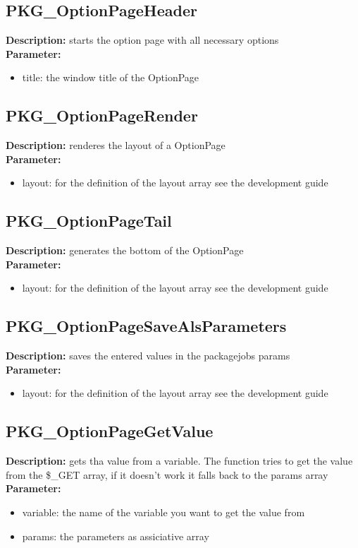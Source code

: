 \subsection{PKG\_OptionPageHeader}
\textbf{Description:} starts the option page with all necessary options\\
\textbf{Parameter:}
\begin{itemize}
\item title: the window title of the OptionPage
\end{itemize}

\subsection{PKG\_OptionPageRender}
\textbf{Description:} renderes the layout of a OptionPage\\
\textbf{Parameter:}
\begin{itemize}
\item layout: for the definition of the layout array see the development guide
\end{itemize}

\subsection{PKG\_OptionPageTail}
\textbf{Description:} generates the bottom of the OptionPage\\
\textbf{Parameter:}
\begin{itemize}
\item layout: for the definition of the layout array see the development guide
\end{itemize}

\subsection{PKG\_OptionPageSaveAlsParameters}
\textbf{Description:} saves the entered values in the packagejobs params\\
\textbf{Parameter:}
\begin{itemize}
\item layout: for the definition of the layout array see the development guide
\end{itemize}

\subsection{PKG\_OptionPageGetValue}
\textbf{Description:} gets tha value from a variable. The function tries to get the value from the \$\_GET array, if it doesn't work it falls back to the params array\\
\textbf{Parameter:}
\begin{itemize}
\item variable: the name of the variable you want to get the value from
\item params: the parameters as assiciative array
\end{itemize}


